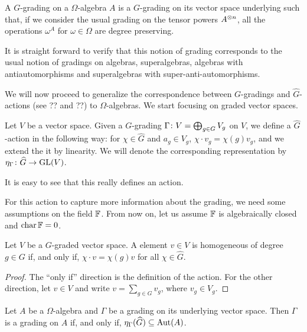 \begin{defi}
    A $G$-grading on a $\Omega$-algebra $A$ is a $G$-grading on its vector space underlying such that, if we consider the usual grading on the tensor powers $A^{\otimes n}$, all the operations $\omega^A$ for $\omega \in \Omega$ are degree preserving.
\end{defi}

It is straight forward to verify that this notion of grading corresponds to the usual notion of gradings on algebras, superalgebras, algebras with antiautomorphisms and superalgebras with super-anti-automorphisms.

We will now proceed to generalize the correspondence between $G$-gradings and $\widehat G$-actions (see ?? and ??) to $\Omega$-algebras. 
We start focusing on graded vector spaces.

\begin{defi}
    Let $V$ be a vector space. 
    Given a $G$-grading $\Gamma\colon V= \bigoplus_{g\in G} V_g$ on $V$, we define a $\widehat G$-action in the following way: for $\chi \in \widehat G$ and $a_g \in V_g$, $\chi \cdot v_g = \chi(g)v_g$, and we extend the it by linearity. 
    We will denote the corresponding representation by $\eta_\Gamma\colon \widehat G \to \operatorname{GL}(V)$.
\end{defi}

It is easy to see that this really defines an action. 

For this action to capture more information about the grading, we need some assumptions on the field $\mathbb{F}$. 
From now on, let us assume $\mathbb{F}$ is algebraically closed and $\operatorname{char} \mathbb{F} = 0$.

\begin{lemma}
    Let $V$ be a $G$-graded vector space. 
    A element $v\in V$ is homogeneous of degree $g\in G$ if, and only if, $\chi\cdot v = \chi(g)v$ for all $\chi \in \widehat G$.
\end{lemma}

\begin{proof}
    The ``only if'' direction is the definition of the action. 
    For the other direction, let $v\in V$ and write $v = \sum_{g\in G} v_g$, where $v_g \in V_g$.
\end{proof}

\begin{prop}
    Let $A$ be a $\Omega$-algebra and $\Gamma$ be a grading on its underlying vector space. 
    Then $\Gamma$ is a grading on $A$ if, and only if, $\eta_\Gamma(\widehat G) \subseteq \operatorname{Aut}(A)$.
\end{prop}

